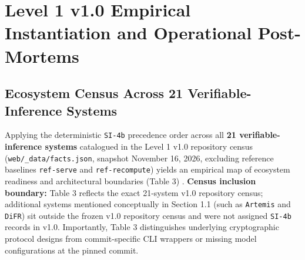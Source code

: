 \documentclass[11pt,letterpaper]{article}
\begin{document}
\section{Level 1 v1.0 Empirical Instantiation and Operational Post-Mortems}

\subsection{Ecosystem Census Across 21 Verifiable-Inference Systems}

Applying the deterministic \texttt{SI-4b} precedence order across all \textbf{21 verifiable-inference systems} catalogued in the Level 1 v1.0 repository census (\texttt{web/\allowbreak{}\_\allowbreak{}data/\allowbreak{}facts.\allowbreak{}json}, snapshot November 16, 2026, excluding reference baselines \texttt{ref-\allowbreak{}serve} and \texttt{ref-\allowbreak{}recompute}) yields an empirical map of ecosystem readiness and architectural boundaries (Table 3) \cite{iproofs2026}. \textbf{Census inclusion boundary:} Table 3 reflects the exact 21-system v1.0 repository census; additional systems mentioned conceptually in Section 1.1 (such as \texttt{Artemis} and \texttt{DiFR}) sit outside the frozen v1.0 repository census and were not assigned \texttt{SI-4b} records in v1.0. Importantly, Table 3 distinguishes underlying cryptographic protocol designs from commit-specific CLI wrappers or missing model configurations at the pinned commit.
\end{document}
